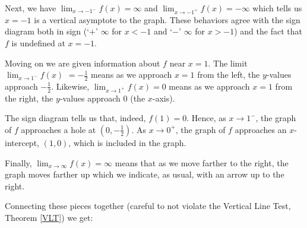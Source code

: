 \documentclass{ximera}
\begin{document}
\begin{example}
\begin{explanation}
Next, we have $\lim_{x \rightarrow -1^{-}} f(x) = \infty$ and  $\lim_{x \rightarrow -1^{+}} f(x) = - \infty$ which tells us $x=-1$ is a vertical asymptote to the graph.  These behaviors agree with the sign diagram both in sign (`$+$' $\infty$ for $x<-1$ and `$-$' $\infty$ for $x>-1$) and the fact that $f$ is undefined at $x = -1$.



Moving on we are given information about $f$ near $x = 1$.    The limit $\lim_{x \rightarrow 1^{-}} f(x)$ $= -\frac{1}{2}$  means as we approach $x=1$ from the left, the $y$-values approach $-\frac{1}{2}$.  Likewise, $\lim_{x \rightarrow 1^{+}} f(x) = 0$ means as we approach $x=1$ from the right, the $y$-values approach $0$ (the $x$-axis).  



The sign diagram tells us that, indeed, $f(1) = 0$.  Hence, as $x \rightarrow 1^{-}$,  the graph of $f$ approaches a hole at $\left(0, -\frac{1}{2}\right)$.  As $x \rightarrow 0^{+}$, the graph of $f$ approaches an $x$-intercept, $(1,0)$, which is included in the graph. 



Finally,   $\lim_{x \rightarrow \infty } f(x) = \infty$  means that as we move farther to the right, the graph moves farther up which we indicate, as usual, with an arrow up to the right.



Connecting these pieces together (careful to not violate the Vertical Line Test, Theorem \ref{VLT}) we get:

\begin{image}
\end{image}
\end{explanation}
\end{example}
\end{document}
